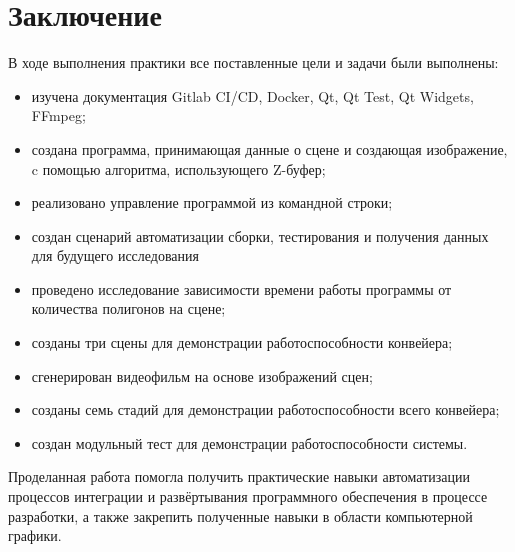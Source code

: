 \chapter*{Заключение}

В ходе выполнения практики все поставленные цели и задачи были выполнены:
\begin{itemize}
	\item изучена документация Gitlab CI/CD, Docker, Qt, Qt Test, Qt Widgets, FFmpeg;
	\item создана программа, принимающая данные о сцене и создающая изображение, c помощью алгоритма, использующего Z-буфер;
	\item реализовано управление программой из командной строки;
	\item создан сценарий автоматизации сборки, тестирования и получения данных для будущего исследования
	\item проведено исследование зависимости времени работы программы от количества полигонов на сцене;
	\item созданы три сцены для демонстрации работоспособности конвейера;
	\item сгенерирован видеофильм на основе изображений сцен;
	\item созданы семь стадий для демонстрации работоспособности всего конвейера;
	\item создан модульный тест для демонстрации работоспособности системы.
\end{itemize}	

Проделанная работа помогла получить практические навыки автоматизации процессов интеграции и
развёртывания программного обеспечения в процессе разработки, а также закрепить полученные навыки в области компьютерной графики.